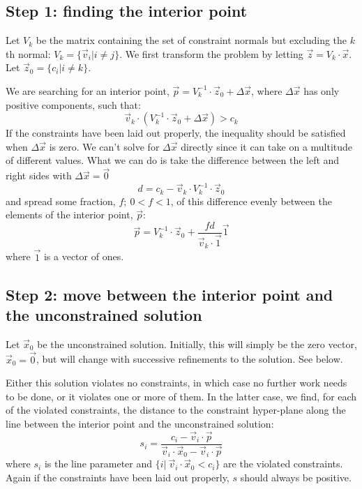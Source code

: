 \documentclass{article}
\begin{document}
\subsection{Step 1: finding the interior point}

Let $V_k$ be the matrix containing the set of constraint normals but
excluding the $k$th normal: $V_k = \lbrace \vec v_i | i \ne j \rbrace$. 
We first transform the problem by letting $\vec z=V_k \cdot \vec x$.
Let $\vec z_0 = \lbrace c_i | i \ne k \rbrace$.

We are searching for an interior point, 
$\vec p = V_k^{-1} \cdot \vec z_0 + \Delta \vec x$, 
where $\Delta \vec x$ has only positive components, such that:
\begin{equation}
	\vec v_k \cdot \left ( V_k^{-1} \cdot \vec z_0 + \Delta \vec x \right ) > c_k
\end{equation}
If the constraints have been laid out properly, the inequality should be 
satisfied when $\Delta \vec x$ is zero.
We can't solve for $\Delta \vec x$ directly since it can take on a 
multitude of different values. What we can do is
take the difference between the left and right sides with $\Delta \vec x = \vec 0$
\begin{equation}
	d = c_k - \vec v_k \cdot V_k^{-1} \cdot \vec z_0
\end{equation}
and spread some fraction, $f;~0 < f < 1$, of this difference evenly between the 
elements of the interior point, $\vec p$:
\begin{equation}
	\vec p = V_k^{-1} \cdot \vec z_0 + \frac{f d}{\vec v_k \cdot \vec 1} \vec 1
\end{equation}
where $\vec 1$ is a vector of ones.

\subsection{Step 2: move between the interior point and the unconstrained solution}

Let $\vec x_0$ be the unconstrained solution. Initially, this will simply be
the zero vector, $\vec x_0 = \vec 0$, but will change with successive 
refinements to the solution. See below. 

Either this solution violates no constraints,
in which case no further work needs to be done, or
it violates one or more of them. In the latter case, we find, for each of the
violated constraints, the distance
to the constraint hyper-plane along the line between the interior point and
the unconstrained solution:
\begin{equation}
	s_i = \frac{c_i - \vec v_i \cdot \vec p}
	{\vec v_i \cdot \vec x_0 - \vec v_i \cdot \vec p}
\end{equation}
where $s_i$ is the line parameter and
$\lbrace i |~\vec v_i \cdot \vec x_0 < c_i \rbrace$ are the violated
constraints. Again if the constraints have been laid out properly, $s$ should
always be positive.
\end{document}
